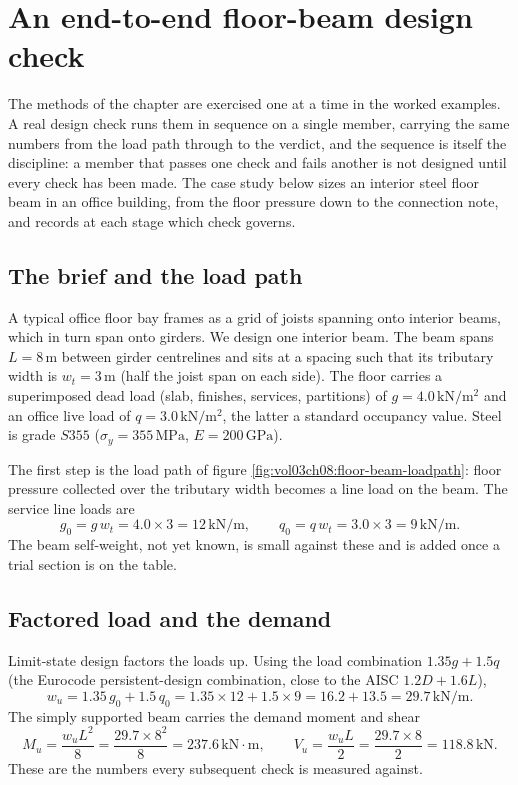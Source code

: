 \section{An end-to-end floor-beam design check}

The methods of the chapter are exercised one at a time in the worked
examples. A real design check runs them in sequence on a single member,
carrying the same numbers from the load path through to the verdict, and
the sequence is itself the discipline: a member that passes one check
and fails another is not designed until every check has been made. The
case study below sizes an interior steel floor beam in an office
building, from the floor pressure down to the connection note, and
records at each stage which check governs.

\subsection{The brief and the load path}

A typical office floor bay frames as a grid of joists spanning onto
interior beams, which in turn span onto girders. We design one interior
beam. The beam spans $L = 8\,\si{\meter}$ between girder centrelines and
sits at a spacing such that its tributary width is $w_t = 3\,\si{\meter}$
(half the joist span on each side). The floor carries a superimposed
dead load (slab, finishes, services, partitions) of $g = 4.0\,\text{kN}/
\text{m}^2$ and an office live load of $q = 3.0\,\text{kN}/\text{m}^2$,
the latter a standard occupancy value. Steel is grade $S355$
($\sigma_y = 355\,\text{MPa}$, $E = 200\,\text{GPa}$).

The first step is the load path of figure
\ref{fig:vol03ch08:floor-beam-loadpath}: floor pressure collected over
the tributary width becomes a line load on the beam. The service line
loads are
\[
g_0 = g\,w_t = 4.0 \times 3 = 12\,\text{kN}/\text{m}, \qquad
q_0 = q\,w_t = 3.0 \times 3 = 9\,\text{kN}/\text{m}.
\]
The beam self-weight, not yet known, is small against these and is added
once a trial section is on the table.



\subsection{Factored load and the demand}

Limit-state design factors the loads up. Using the load combination
$1.35 g + 1.5 q$ (the Eurocode persistent-design combination, close to
the AISC $1.2D + 1.6L$),
\[
w_u = 1.35\,g_0 + 1.5\,q_0 = 1.35 \times 12 + 1.5 \times 9
= 16.2 + 13.5 = 29.7\,\text{kN}/\text{m}.
\]
The simply supported beam carries the demand moment and shear
\[
M_u = \frac{w_u L^2}{8} = \frac{29.7 \times 8^2}{8}
= 237.6\,\text{kN}\cdot\text{m}, \qquad
V_u = \frac{w_u L}{2} = \frac{29.7 \times 8}{2} = 118.8\,\text{kN}.
\]
These are the numbers every subsequent check is measured against.

